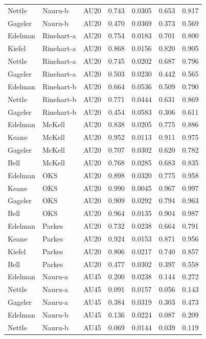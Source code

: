 \documentclass{monashthesis}
\begin{document}
\begin{center}
\begin{longtable}{lllllll}
Nettle & Nauru-b & AU20 & 0.743 & 0.0305 & 0.653 & 0.817 \\
Gageler & Nauru-b & AU20 & 0.470 & 0.0369 & 0.373 & 0.569 \\
Edelman & Rinehart-a & AU20 & 0.754 & 0.0183 & 0.701 & 0.800 \\
Kiefel & Rinehart-a & AU20 & 0.868 & 0.0156 & 0.820 & 0.905 \\
Nettle & Rinehart-a & AU20 & 0.745 & 0.0202 & 0.687 & 0.796 \\
Gageler & Rinehart-a & AU20 & 0.503 & 0.0230 & 0.442 & 0.565 \\
Edelman & Rinehart-b & AU20 & 0.664 & 0.0536 & 0.509 & 0.790 \\
Nettle & Rinehart-b & AU20 & 0.771 & 0.0444 & 0.631 & 0.869 \\
Gageler & Rinehart-b & AU20 & 0.454 & 0.0583 & 0.306 & 0.611 \\
Edelman & McKell & AU20 & 0.838 & 0.0205 & 0.775 & 0.886 \\
Keane & McKell & AU20 & 0.952 & 0.0113 & 0.911 & 0.975 \\
Gageler & McKell & AU20 & 0.707 & 0.0302 & 0.620 & 0.782 \\
Bell & McKell & AU20 & 0.768 & 0.0285 & 0.683 & 0.835 \\
Edelman & OKS & AU20 & 0.898 & 0.0320 & 0.775 & 0.958 \\
Keane & OKS & AU20 & 0.990 & 0.0045 & 0.967 & 0.997 \\
Gageler & OKS & AU20 & 0.909 & 0.0292 & 0.794 & 0.963 \\
Bell & OKS & AU20 & 0.964 & 0.0135 & 0.904 & 0.987 \\
Edelman & Parkes & AU20 & 0.732 & 0.0238 & 0.664 & 0.791 \\
Keane & Parkes & AU20 & 0.924 & 0.0153 & 0.871 & 0.956 \\
Kiefel & Parkes & AU20 & 0.806 & 0.0217 & 0.740 & 0.857 \\
Bell & Parkes & AU20 & 0.477 & 0.0302 & 0.397 & 0.558 \\
Edelman & Nauru-a & AU45 & 0.200 & 0.0238 & 0.144 & 0.272 \\
Nettle & Nauru-a & AU45 & 0.091 & 0.0157 & 0.056 & 0.143 \\
Gageler & Nauru-a & AU45 & 0.384 & 0.0319 & 0.303 & 0.473 \\
Edelman & Nauru-b & AU45 & 0.136 & 0.0224 & 0.087 & 0.209 \\
Nettle & Nauru-b & AU45 & 0.069 & 0.0144 & 0.039 & 0.119 \\

\end{longtable}
\end{center}
\end{document}
